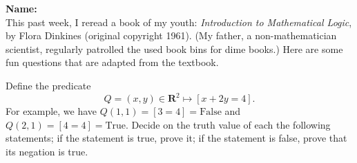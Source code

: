 \documentclass[12pt,fleqn,answers]{exam}
\newcommand{\reals}{\mathbf{R}}
\begin{document}
\large
\vspace{0.1in}
\noindent{}
{\bf Name:}  \\

\noindent This past week, I reread a book of my youth: \emph{Introduction
to Mathematical Logic}, by Flora Dinkines (original copyright 1961).
(My father, a non-mathematician scientist, regularly patrolled the used book bins
for dime books.) Here are some fun questions that are adapted from the textbook.

\begin{questions}
\question Define the predicate 
\begin{equation*}
   Q = (x,y) \in \reals^2 \mapsto [x + 2 y = 4].
\end{equation*}
For example, we have $Q(1,1) = [3 = 4] = \mbox{False}$
and $Q(2,1) = [ 4= 4] = \mbox{True}$. Decide on the truth 
value of each the following statements; if the statement 
is true, prove it; if the statement is false, prove that 
its negation is true.



\end{questions}
\end{document}
